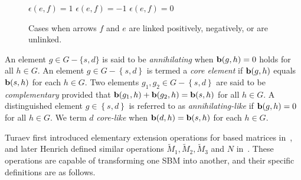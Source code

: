 \documentclass[12pt]{amsart}
\theoremstyle{noparens}
\numberwithin{equation}{section}
\numberwithin{equation}{section}
\begin{document}
\begin{figure}[htbp]
\begin{center}
		\centerline{$\epsilon (e,f) = 1$ \quad\qquad $\epsilon(e,f) = -1$ \quad\qquad $\epsilon (e,f) = 0$} 
		\caption{Cases when arrows $f$ and $e$ are linked positively, negatively, or are unlinked.}
		\label{fig7}
	\end{center}
\end{figure}

An element $g \in G - \{s, d\}$ is said to be \textit{annihilating} when ${\bf b}(g, h) = 0$ holds for all $h\in G$. An element $g\in G - \left\{s, d\right\}$ is termed a \textit{core element} if ${\bf b}(g, h)$ equals ${\bf b}(s, h)$ for each $h\in G$. Two elements $g_1, g_2\in G - \left\{s, d\right\}$ are said to be \textit{complementary} provided that ${\bf b}(g_1, h) + {\bf b}(g_2, h) = {\bf b}(s, h)$ for all $h\in G$. A distinguished element $g\in \left\{s, d\right\}$ is referred to as \textit{annihilating-like} if ${\bf b}(g, h) = 0$ for all $h\in G$. We term $d$ \textit{core-like} when ${\bf b}(d, h) = {\bf b}(s, h)$ for each $h\in G$.

Turaev first introduced elementary extension operations for based matrices in~\cite{Tur2}, and later Henrich defined similar operations $\widetilde{M}_1, \widetilde{M}_2, \widetilde{M}_3$ and $N$ in~\cite{Hen}. These operations are capable of transforming one SBM into another, and their specific definitions are as follows.
\end{document}
